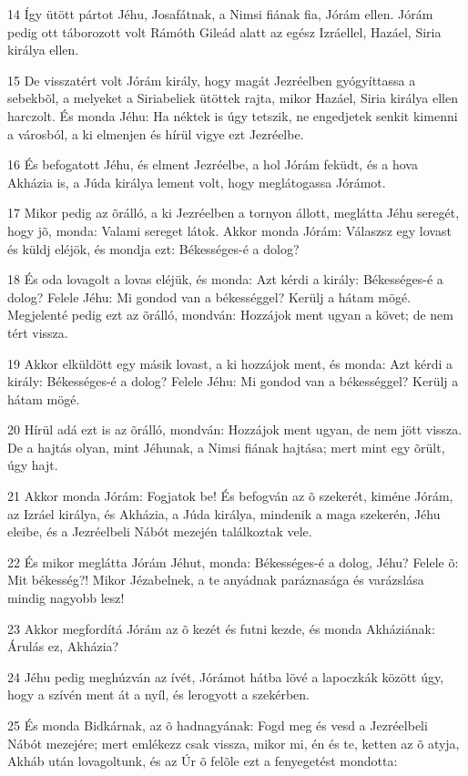 \par 14 Így ütött pártot Jéhu, Josafátnak, a Nimsi fiának fia, Jórám ellen. Jórám pedig ott táborozott volt Rámóth Gileád alatt az egész Izráellel, Hazáel, Siria királya ellen.
\par 15 De visszatért volt Jórám király, hogy magát Jezréelben gyógyíttassa a sebekbõl, a melyeket a Siriabeliek ütöttek rajta, mikor Hazáel, Siria királya ellen harczolt. És monda Jéhu: Ha néktek is úgy tetszik, ne engedjetek senkit kimenni a városból, a ki elmenjen és hírül vigye ezt Jezréelbe.
\par 16 És befogatott Jéhu, és elment Jezréelbe, a hol Jórám feküdt, és a hova Akházia is, a Júda királya lement volt, hogy meglátogassa Jórámot.
\par 17 Mikor pedig az õrálló, a ki Jezréelben a tornyon állott, meglátta Jéhu seregét, hogy jõ, monda: Valami sereget látok. Akkor monda Jórám: Válaszsz egy lovast és küldj eléjök, és mondja ezt: Békességes-é a dolog?
\par 18 És oda lovagolt a lovas eléjük, és monda: Azt kérdi a király: Békességes-é a dolog? Felele Jéhu: Mi gondod van a békességgel? Kerülj a hátam mögé. Megjelenté pedig ezt az õrálló, mondván: Hozzájok ment ugyan a követ; de nem tért vissza.
\par 19 Akkor elküldött egy másik lovast, a ki hozzájok ment, és monda: Azt kérdi a király: Békességes-é a dolog? Felele Jéhu: Mi gondod van a békességgel? Kerülj a hátam mögé.
\par 20 Hírül adá ezt is az õrálló, mondván: Hozzájok ment ugyan, de nem jött vissza. De a hajtás olyan, mint Jéhunak, a Nimsi fiának hajtása; mert mint egy õrült, úgy hajt.
\par 21 Akkor monda Jórám: Fogjatok be! És befogván az õ szekerét, kiméne Jórám, az Izráel királya, és Akházia, a Júda királya, mindenik a maga szekerén, Jéhu eleibe, és a Jezréelbeli Nábót mezején találkoztak vele.
\par 22 És mikor meglátta Jórám Jéhut, monda: Békességes-é a dolog, Jéhu? Felele õ: Mit békesség?! Mikor Jézabelnek, a te anyádnak paráznasága és varázslása mindig nagyobb lesz!
\par 23 Akkor megfordítá Jórám az õ kezét és futni kezde, és monda Akháziának: Árulás ez, Akházia?
\par 24 Jéhu pedig meghúzván az ívét, Jórámot hátba lövé a lapoczkák között úgy, hogy a szívén ment át a nyíl, és lerogyott a szekérben.
\par 25 És monda Bidkárnak, az õ hadnagyának: Fogd meg és vesd a Jezréelbeli Nábót mezejére; mert emlékezz csak vissza, mikor mi, én és te, ketten az õ atyja, Akháb után lovagoltunk, és az Úr õ felõle ezt a fenyegetést mondotta:
